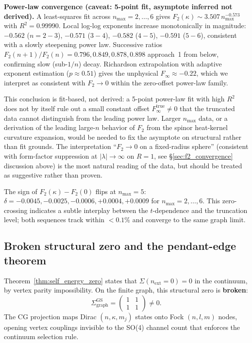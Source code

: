\documentclass[11pt]{article}
\begin{document}
\textbf{Power-law convergence (caveat: 5-point fit, asymptote
inferred not derived).}
A least-squares fit across $n_{\max} = 2, \ldots, 6$ gives
$F_2(\kappa) \sim 3.507\, n_{\max}^{-0.573}$ with $R^2 = 0.99990$.
Local log-log exponents increase monotonically in magnitude:
$-0.562$ ($n = 2{-}3$), $-0.571$ ($3{-}4$), $-0.582$ ($4{-}5$),
$-0.591$ ($5{-}6$), consistent with a slowly steepening power law.
Successive ratios $F_2(n{+}1)/F_2(n) = 0.796, 0.849, 0.878, 0.898$
approach~1 from below, confirming slow (sub-$1/n$) decay.
Richardson extrapolation with adaptive exponent estimation
($p \approx 0.51$) gives the unphysical $F_{\infty} \approx -0.22$,
which we interpret as consistent with $F_2 \to 0$ within the
zero-offset power-law family.

This conclusion is fit-based, not derived: a 5-point power-law fit
with high $R^2$ does not by itself rule out a small constant offset
$F_\infty^{\mathrm{true}} \ne 0$ that the truncated data cannot
distinguish from the leading power law.  Larger $n_{\max}$ data, or a
derivation of the leading large-$n$ behavior of $F_2$ from the spinor
heat-kernel curvature expansion, would be needed to fix the asymptote
on structural rather than fit grounds.  The interpretation
``$F_2 \to 0$ on a fixed-radius sphere'' (consistent with form-factor
suppression at $|\lambda| \to \infty$ on $R = 1$, see
§\ref{sec:f2_convergence} discussion above) is the most natural
reading of the data, but should be treated as suggestive rather than
proven.

The sign of $F_2(\kappa) - F_2(0)$ flips at $n_{\max} = 5$:
$\delta = -0.0045, -0.0025, -0.0006, +0.0004, +0.0009$ for
$n_{\max} = 2, \ldots, 6$.  This zero-crossing indicates a subtle
interplay between the $t$-dependence and the truncation level; both
sequences track within $<0.1\%$ and converge to the same graph limit.

\subsection{Broken structural zero and the pendant-edge theorem}
\label{sec:broken_structural_zero}

Theorem~\ref{thm:self_energy_zero} states that $\Sigma(n_{\mathrm{ext}} = 0)
= 0$ in the continuum, by vertex parity impossibility.  On the finite
graph, this structural zero is \textbf{broken}:
\[
  \Sigma_{\text{graph}}^{\text{GS}} =
  \begin{pmatrix} 1 & 1 \\ 1 & 1 \end{pmatrix}
  \neq 0.
\]
The CG projection maps Dirac $(n,\kappa,m_j)$ states onto Fock
$(n,l,m)$ nodes, opening vertex couplings invisible to the SO(4)
channel count that enforces the continuum selection rule.
\end{document}
